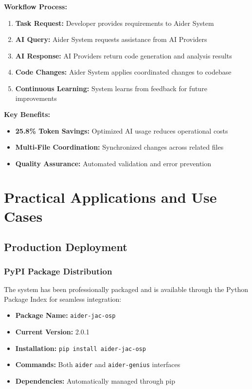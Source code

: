 \documentclass[12pt,a4paper]{article}
\begin{document}
\textbf{Workflow Process:}
\begin{enumerate}
    \item \textbf{Task Request:} Developer provides requirements to Aider System
    \item \textbf{AI Query:} Aider System requests assistance from AI Providers
    \item \textbf{AI Response:} AI Providers return code generation and analysis results
    \item \textbf{Code Changes:} Aider System applies coordinated changes to codebase
    \item \textbf{Continuous Learning:} System learns from feedback for future improvements
\end{enumerate}

\textbf{Key Benefits:}
\begin{itemize}
    \item \textbf{25.8\% Token Savings:} Optimized AI usage reduces operational costs
    \item \textbf{Multi-File Coordination:} Synchronized changes across related files
    \item \textbf{Quality Assurance:} Automated validation and error prevention
\end{itemize}

\section{Practical Applications and Use Cases}

\subsection{Production Deployment}

\subsubsection{PyPI Package Distribution}
The system has been professionally packaged and is available through the Python Package Index for seamless integration:

\begin{itemize}
    \item \textbf{Package Name:} \texttt{aider-jac-osp}
    \item \textbf{Current Version:} 2.0.1
    \item \textbf{Installation:} \texttt{pip install aider-jac-osp}
    \item \textbf{Commands:} Both \texttt{aider} and \texttt{aider-genius} interfaces
    \item \textbf{Dependencies:} Automatically managed through pip
\end{itemize}
\end{document}
